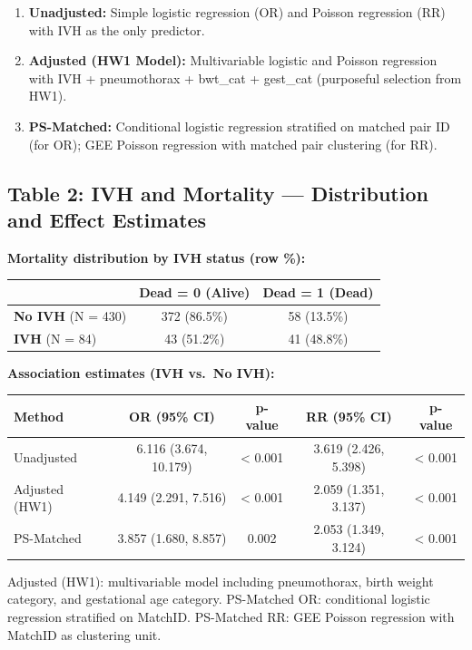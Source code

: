 \documentclass[
]{article}
\providecommand{\tightlist}{%
  \setlength{\itemsep}{0pt}\setlength{\parskip}{0pt}}
\begin{document}
\begin{enumerate}
\def\labelenumi{\arabic{enumi}.}
\tightlist
\item
  \textbf{Unadjusted:} Simple logistic regression (OR) and Poisson
  regression (RR) with IVH as the only predictor.
\item
  \textbf{Adjusted (HW1 Model):} Multivariable logistic and Poisson
  regression with IVH + pneumothorax + bwt\_cat + gest\_cat (purposeful
  selection from HW1).
\item
  \textbf{PS-Matched:} Conditional logistic regression stratified on
  matched pair ID (for OR); GEE Poisson regression with matched pair
  clustering (for RR).
\end{enumerate}

\hypertarget{table-2-ivh-and-mortality-distribution-and-effect-estimates}{%
\subsection{Table 2: IVH and Mortality --- Distribution and Effect
Estimates}\label{table-2-ivh-and-mortality-distribution-and-effect-estimates}}

\textbf{Mortality distribution by IVH status (row \%):}

\begin{longtable}[]{@{}lcc@{}}
\toprule
& Dead = 0 (Alive) & Dead = 1 (Dead) \\
\midrule
\endhead
\textbf{No IVH} (N = 430) & 372 (86.5\%) & 58 (13.5\%) \\
\textbf{IVH} (N = 84) & 43 (51.2\%) & 41 (48.8\%) \\
\bottomrule
\end{longtable}

\textbf{Association estimates (IVH vs.~No IVH):}

\begin{longtable}[]{@{}lcccc@{}}
\toprule
Method & OR (95\% CI) & p-value & RR (95\% CI) & p-value \\
\midrule
\endhead
Unadjusted & 6.116 (3.674, 10.179) & \textless{} 0.001 & 3.619 (2.426,
5.398) & \textless{} 0.001 \\
Adjusted (HW1) & 4.149 (2.291, 7.516) & \textless{} 0.001 & 2.059
(1.351, 3.137) & \textless{} 0.001 \\
PS-Matched & 3.857 (1.680, 8.857) & 0.002 & 2.053 (1.349, 3.124) &
\textless{} 0.001 \\
\bottomrule
\end{longtable}

Adjusted (HW1): multivariable model including pneumothorax, birth weight
category, and gestational age category. PS-Matched OR: conditional
logistic regression stratified on MatchID. PS-Matched RR: GEE Poisson
regression with MatchID as clustering unit.
\end{document}

